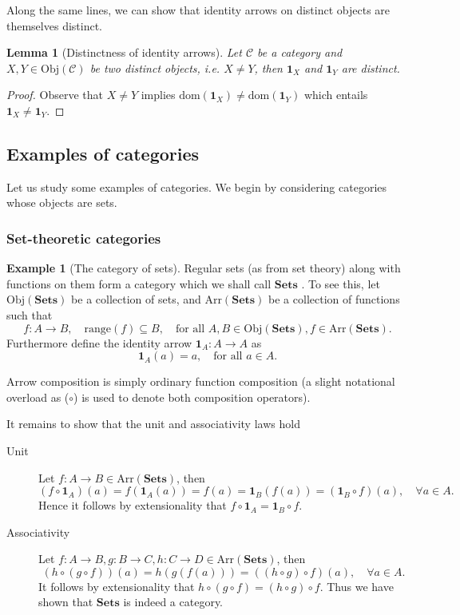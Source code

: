 \documentclass[10pt,twoside,a4paper]{article}
\newcounter{theorem}
\theoremstyle{plain}
\newtheorem{lemma}[thm]{Lemma}
\theoremstyle{definition}
\newtheorem{example}{Example}[section]
\newcommand{\domain}[1]{%
  \mathrm{dom}(#1)%
}
\newcommand{\range}[1]{%
  \mathrm{range}(#1)%
}
\newcommand{\id}[1]{%
  \ensuremath{\mathbf{1}_{#1}}%
}
\newcommand{\Obj}[1]{%
  \ensuremath{\mathrm{Obj}(#1)}%
}
\newcommand{\Arr}[1]{%
  \ensuremath{\mathrm{Arr}(#1)}%
}
\newcommand{\Catname}[1]{%
  \ensuremath{\mathbf{#1}}%
}
\newcommand{\Sets}[0]{\Catname{Sets}}
\begin{document}
Along the same lines, we can show that identity arrows on distinct
objects are themselves distinct.
\begin{lemma}[Distinctness of identity arrows]
  Let $\mathcal{C}$ be a category and $X,Y \in \Obj{\mathcal{C}}$ be
  two distinct objects, i.e. $X \neq Y$, then $\id{X}$ and $\id{Y}$
  are distinct.
\end{lemma}
\begin{proof}
  Observe that $X \neq Y$ implies
  $\domain{\id{X}} \neq \domain{\id{Y}}$ which entails
  $\id{X} \neq \id{Y}$.
\end{proof}

\subsection{Examples of categories}

Let us study some examples of categories. We begin by considering
categories whose objects are sets.

\subsubsection{Set-theoretic categories}

\begin{example}[The category of sets]
\label{ex:sets}
  Regular sets (as from set theory) along with functions on them form
  a category which we shall call \Sets{}. To see this, let
  $\Obj{\Sets}$ be a collection of sets, and $\Arr{\Sets}$ be a
  collection of functions such that
\[
  f : A \to B, \quad \range{f} \subseteq B, \quad \text{for all } A,B \in \Obj{\Sets}, f \in \Arr{\Sets}.
\]
Furthermore define the identity arrow $\id{A} : A \to A$ as
\[
   \id{A}(a) = a, \quad \text{for all } a \in A.
\]

Arrow composition is simply ordinary function composition (a slight
notational overload as ($\circ$) is used to denote both composition
operators).

It remains to show that the unit and associativity laws hold
\begin{description}
  \item[Unit] Let $f : A \to B \in \Arr{\Sets}$, then
\[
  (f \circ \id{A})(a) = f(\id{A}(a)) = f(a) = \id{B}(f(a)) = (\id{B} \circ f)(a), \quad \forall a \in A.
\]
Hence it follows by extensionality that
$f \circ \id{A} = \id{B} \circ f$.

\item[Associativity] Let $f : A \to B, g : B \to C, h : C \to D \in \Arr{\Sets}$, then
\[
  (h \circ (g \circ f))(a) = h(g(f(a))) = ((h \circ g) \circ f)(a), \quad \forall a \in A.
\]
It follows by extensionality that
$h \circ (g \circ f) = (h \circ g) \circ f$. Thus we have shown that
\Sets{} is indeed a category.
\end{description}
\end{example}
\end{document}
